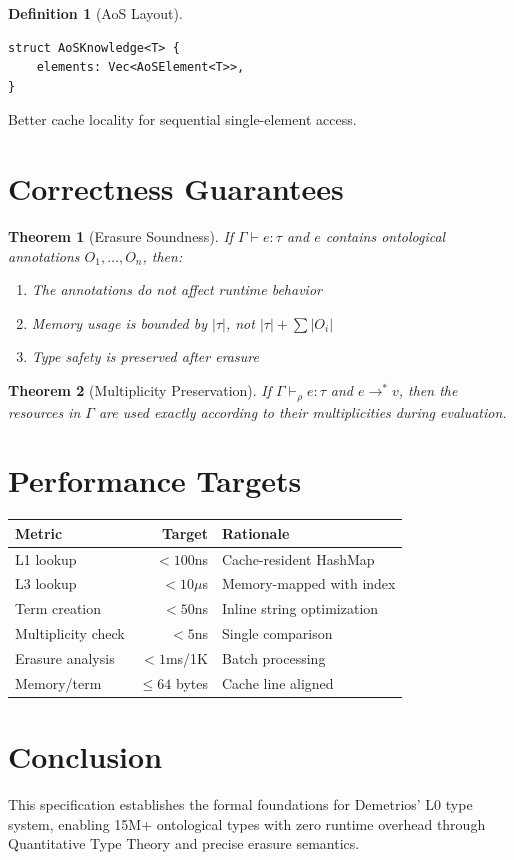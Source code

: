\documentclass[11pt]{article}
\newtheorem{definition}{Definition}
\newtheorem{theorem}{Theorem}
\newcommand{\mult}{\rho}
\begin{document}
\begin{definition}[AoS Layout]
\begin{verbatim}
struct AoSKnowledge<T> {
    elements: Vec<AoSElement<T>>,
}
\end{verbatim}
\end{definition}

Better cache locality for sequential single-element access.

\section{Correctness Guarantees}

\begin{theorem}[Erasure Soundness]
If $\Gamma \vdash e : \tau$ and $e$ contains ontological annotations
$O_1, \ldots, O_n$, then:
\begin{enumerate}
\item The annotations do not affect runtime behavior
\item Memory usage is bounded by $|\tau|$, not $|\tau| + \sum |O_i|$
\item Type safety is preserved after erasure
\end{enumerate}
\end{theorem}

\begin{theorem}[Multiplicity Preservation]
If $\Gamma \vdash_\mult e : \tau$ and $e \to^* v$, then the resources in
$\Gamma$ are used exactly according to their multiplicities during evaluation.
\end{theorem}

\section{Performance Targets}

\begin{center}
\begin{tabular}{|l|r|l|}
\hline
\textbf{Metric} & \textbf{Target} & \textbf{Rationale} \\
\hline
L1 lookup & $< 100$ns & Cache-resident HashMap \\
L3 lookup & $< 10\mu$s & Memory-mapped with index \\
Term creation & $< 50$ns & Inline string optimization \\
Multiplicity check & $< 5$ns & Single comparison \\
Erasure analysis & $< 1$ms/1K & Batch processing \\
Memory/term & $\leq 64$ bytes & Cache line aligned \\
\hline
\end{tabular}
\end{center}

\section{Conclusion}

This specification establishes the formal foundations for Demetrios' L0
type system, enabling 15M+ ontological types with zero runtime overhead
through Quantitative Type Theory and precise erasure semantics.
\end{document}
